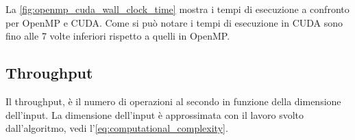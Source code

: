 \documentclass[12pt,a4paper]{report}
\begin{document}
\begin{figure}[H]
\end{figure}

La \autoref{fig:openmp_cuda_wall_clock_time} mostra i tempi di esecuzione a confronto per OpenMP e CUDA.
Come si può notare i tempi di esecuzione in CUDA sono fino alle 7 volte inferiori rispetto a quelli in OpenMP.

\subsection{Throughput}

Il throughput, è il numero di operazioni al secondo in funzione della dimensione dell'input.
La dimensione dell'input è approssimata con il lavoro svolto dall'algoritmo, vedi l'\autoref{eq:computational_complexity}.
\end{document}
